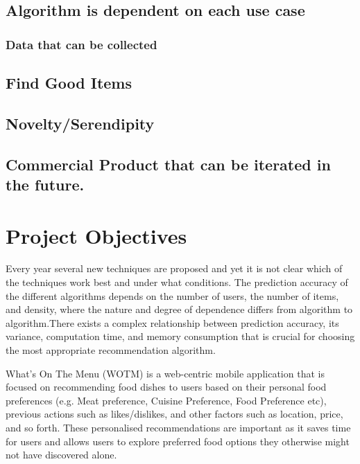 \subsection{Algorithm is dependent on each use case}
\subsubsection{Data that can be collected}
\subsection{Find Good Items}
\subsection{Novelty/Serendipity}
\subsection{Commercial Product that can be iterated in the future.}
\section{Project Objectives}



 Every year several new techniques are proposed and yet it is not clear which of the techniques work best and under what conditions. 
The prediction accuracy of the different algorithms depends on the number of users, the number of items, and density, where the nature and degree of dependence differs from algorithm to algorithm.There exists a complex relationship between prediction accuracy, its variance, computation
time, and memory consumption that is crucial for choosing the most appropriate recommendation algorithm.


What’s On The Menu (WOTM) is a web-centric mobile application that is focused on recommending food dishes to users based on their personal food preferences (e.g. Meat preference, Cuisine Preference, Food Preference etc), previous actions such as likes/dislikes, and other factors such as location, price, and so forth. These personalised recommendations are important as it saves time for users and allows users to explore preferred food options they otherwise might not have discovered alone. 

\section{} \label{section:wotm}

